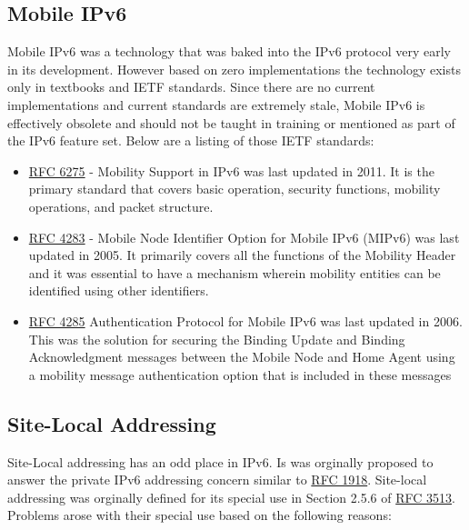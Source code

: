 \documentclass[
]{article}
\providecommand{\tightlist}{%
  \setlength{\itemsep}{0pt}\setlength{\parskip}{0pt}}
\begin{document}
\subsection{Mobile IPv6}\label{mobile-ipv6}

Mobile IPv6 was a technology that was baked into the IPv6 protocol very
early in its development. However based on zero implementations the
technology exists only in textbooks and IETF standards. Since there are
no current implementations and current standards are extremely stale,
Mobile IPv6 is effectively obsolete and should not be taught in training
or mentioned as part of the IPv6 feature set. Below are a listing of
those IETF standards:

\begin{itemize}
\tightlist
\item
  \href{https://www.rfc-editor.org/rfc/rfc6275.html}{RFC 6275} -
  Mobility Support in IPv6 was last updated in 2011. It is the primary
  standard that covers basic operation, security functions, mobility
  operations, and packet structure.
\item
  \href{https://www.rfc-editor.org/rfc/rfc4283.html}{RFC 4283} - Mobile
  Node Identifier Option for Mobile IPv6 (MIPv6) was last updated in
  2005. It primarily covers all the functions of the Mobility Header and
  it was essential to have a mechanism wherein mobility entities can be
  identified using other identifiers.
\item
  \href{https://www.rfc-editor.org/info/rfc4285}{RFC 4285}
  Authentication Protocol for Mobile IPv6 was last updated in 2006. This
  was the solution for securing the Binding Update and Binding
  Acknowledgment messages between the Mobile Node and Home Agent using a
  mobility message authentication option that is included in these
  messages
\end{itemize}

\subsection{Site-Local Addressing}\label{site-local-addressing}

Site-Local addressing has an odd place in IPv6. Is was orginally
proposed to answer the private IPv6 addressing concern similar to
\href{https://www.rfc-editor.org/rfc/rfc1918.html}{RFC 1918}. Site-local
addressing was orginally defined for its special use in Section 2.5.6 of
\href{https://www.rfc-editor.org/rfc/rfc3513.html\#section-2.5.6}{RFC
3513}. Problems arose with their special use based on the following
reasons:
\end{document}
